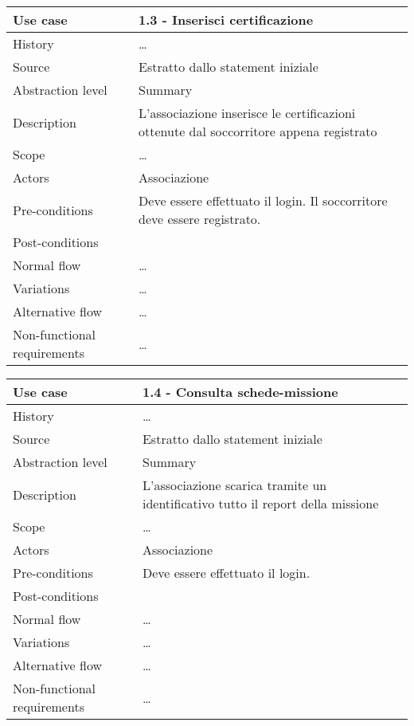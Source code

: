 \documentclass{article}
\begin{document}
    \begin{table}
        \begin{tabularx}{\textwidth}{l|X}
            Use case & 1.3 - Inserisci certificazione \\
            \hline
            History & \dots \\
            Source & Estratto dallo statement iniziale\\
            Abstraction level & Summary\\
            Description & L’associazione inserisce le certificazioni ottenute dal  soccorritore appena registrato\\
            Scope & \dots\\
            Actors & Associazione\\
            Pre-conditions & Deve essere effettuato il login. Il soccorritore deve essere registrato.\\
            Post-conditions & \\
            Normal flow & \dots \\
            Variations & \dots \\
            Alternative flow & \dots \\
            Non-functional requirements & \dots
        \end{tabularx}
        \label{tab:usecase1.3}
    \end{table}

    \begin{table}
        \begin{tabularx}{\textwidth}{l|X}
            Use case & 1.4 - Consulta schede-missione \\
            \hline
            History & \dots \\
            Source & Estratto dallo statement iniziale\\
            Abstraction level & Summary\\
            Description & L’associazione scarica tramite un identificativo tutto il report della missione\\
            Scope & \dots\\
            Actors & Associazione\\
            Pre-conditions & Deve essere effettuato il login.\\
            Post-conditions & \\
            Normal flow & \dots \\
            Variations & \dots \\
            Alternative flow & \dots \\
            Non-functional requirements & \dots
        \end{tabularx}
        \label{tab:usecase1.4}
    \end{table}
\end{document}
